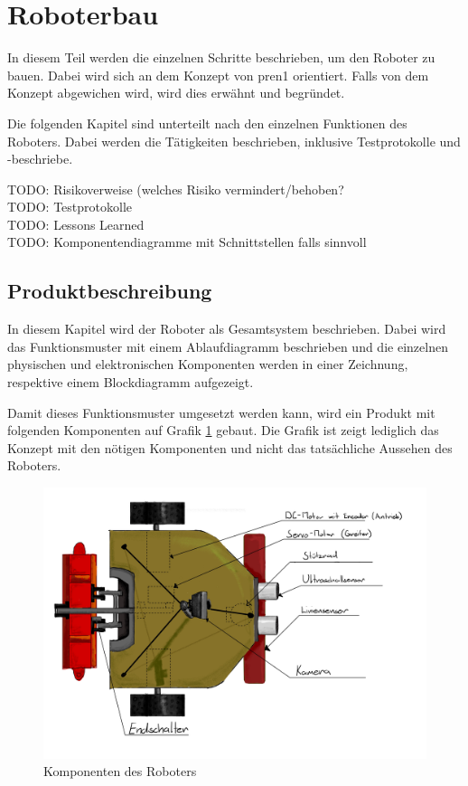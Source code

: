 \section{Roboterbau}

In diesem Teil werden die einzelnen Schritte beschrieben, um den Roboter zu bauen. Dabei wird sich an dem Konzept von \acrshort{pren1} orientiert. Falls von dem Konzept abgewichen wird, wird dies erwähnt und begründet.

Die folgenden Kapitel sind unterteilt nach den einzelnen Funktionen des Roboters. Dabei werden die Tätigkeiten beschrieben, inklusive Testprotokolle und -beschriebe.

TODO: Risikoverweise (welches Risiko vermindert/behoben? \\
TODO: Testprotokolle \\
TODO: Lessons Learned \\
TODO: Komponentendiagramme mit Schnittstellen falls sinnvoll \\

\subsection{Produktbeschreibung}

In diesem Kapitel wird der Roboter als Gesamtsystem beschrieben. Dabei wird das Funktionsmuster mit einem Ablaufdiagramm beschrieben und die einzelnen physischen und elektronischen Komponenten werden in einer Zeichnung, respektive einem Blockdiagramm aufgezeigt.



Damit dieses Funktionsmuster umgesetzt werden kann, wird ein Produkt mit folgenden Komponenten auf Grafik \ref{fig:components} gebaut. Die Grafik ist zeigt lediglich das Konzept mit den nötigen Komponenten und nicht das tatsächliche Aussehen des Roboters.

\begin{figure}[H]
\centering
\includegraphics[width=\textwidth]{assets/gesamtkonzept/Skizze-Fahrzeugkonzept-Beschriftet.jpg}
\caption{Komponenten des Roboters}
\label{fig:components}
\end{figure}


